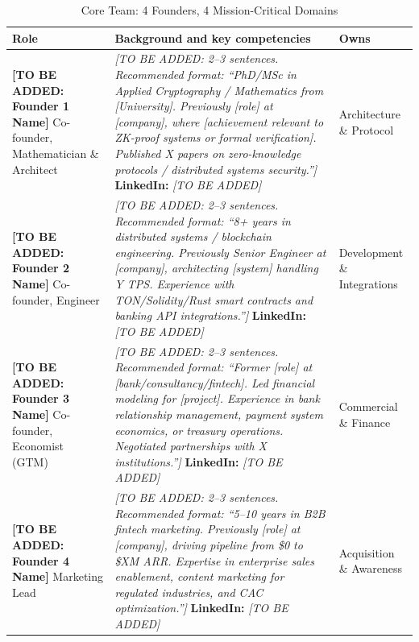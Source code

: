 \documentclass[11pt,a4paper]{article}
\begin{document}
\begin{table}[htbp]
\centering
\caption{Core Team: 4 Founders, 4 Mission-Critical Domains}
\begin{tabularx}{\linewidth}{@{}p{4cm}X p{2.5cm}@{}}
\toprule
\textbf{Role} & \textbf{Background and key competencies} & \textbf{Owns} \\
\midrule
\textbf{[TO BE ADDED: Founder 1 Name]}
\newline Co-founder, Mathematician \& Architect
& {\small\color{placeholderborder!60!black}\textit{[TO BE ADDED: 2--3 sentences. Recommended format: ``PhD/MSc in Applied Cryptography / Mathematics from [University]. Previously [role] at [company], where [achievement relevant to ZK-proof systems or formal verification]. Published X papers on zero-knowledge protocols / distributed systems security.'']}} \newline \textbf{LinkedIn:} \textit{[TO BE ADDED]}
& Architecture \& Protocol \\[8pt]

\textbf{[TO BE ADDED: Founder 2 Name]}
\newline Co-founder, Engineer
& {\small\color{placeholderborder!60!black}\textit{[TO BE ADDED: 2--3 sentences. Recommended format: ``8+ years in distributed systems / blockchain engineering. Previously Senior Engineer at [company], architecting [system] handling Y TPS. Experience with TON/Solidity/Rust smart contracts and banking API integrations.'']}} \newline \textbf{LinkedIn:} \textit{[TO BE ADDED]}
& Development \& Integrations \\[8pt]

\textbf{[TO BE ADDED: Founder 3 Name]}
\newline Co-founder, Economist (GTM)
& {\small\color{placeholderborder!60!black}\textit{[TO BE ADDED: 2--3 sentences. Recommended format: ``Former [role] at [bank/consultancy/fintech]. Led financial modeling for [project]. Experience in bank relationship management, payment system economics, or treasury operations. Negotiated partnerships with X institutions.'']}} \newline \textbf{LinkedIn:} \textit{[TO BE ADDED]}
& Commercial \& Finance \\[8pt]

\textbf{[TO BE ADDED: Founder 4 Name]}
\newline Marketing Lead
& {\small\color{placeholderborder!60!black}\textit{[TO BE ADDED: 2--3 sentences. Recommended format: ``5--10 years in B2B fintech marketing. Previously [role] at [company], driving pipeline from \$0 to \$XM ARR. Expertise in enterprise sales enablement, content marketing for regulated industries, and CAC optimization.'']}} \newline \textbf{LinkedIn:} \textit{[TO BE ADDED]}
& Acquisition \& Awareness \\
\bottomrule
\end{tabularx}
\end{table}
\end{document}
